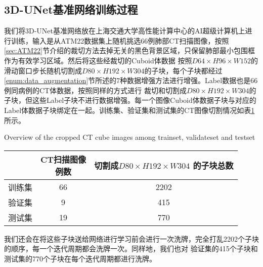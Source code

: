 \subsection{3D-UNet基准网络训练过程}\label{sec:baseline_experiment_training}
我们将3D-UNet基准网络放在上海交通大学高性能计算中心的AI超级计算机上进行训练，输入是从ATM22数据集上随机挑选66例肺部CT扫描图像，按照
\ref{sec:ATM22}节介绍的裁切方法去掉无关的黑色背景区域，只保留肺部最小包围框作为有效学习区域。然后将这些经裁切的Cuboid体数据
按照$D64 \times H96 \times W152$的滑动窗口步长随机切割成$D80 \times H192 \times W304$的子块，每个子块都经过
\ref{enum:data_augmentation}节所述的7种数据增强方法进行增强。Label数据也是66例同病例的CT体数据，按照同样的方式进行
裁切和切割成$D80 \times H192 \times W304$的子块，但这些Label子块不进行数据增强。每一个图像Cuboid体数据子块与对应的
Label体数据子块绑定在一起。训练集、验证集和测试集的CT图像切割情况如表\ref{tbl:dataset_overview}所示。
\begin{table}[!htp]
        {Overview of the cropped CT cube images among trainset, validateset and testset}
    \label{tbl:dataset_overview}
    \centering
    \begin{tabular}{c|c|c}
        \hline
          & \makecell{CT扫描图像\\例数} & \makecell{切割成$D80 \times H192 \times W304$\\的子块总数} \\
        \hline
        训练集 & 66 & 2202 \\
        验证集 & 9  & 415 \\
        测试集 & 19 & 770 \\
        \hline
    \end{tabular}
\end{table}
我们还会在将这些子块送给网络进行学习前会进行一次洗牌，完全打乱2202个子块的顺序，每一个迭代周期都会洗牌一次。同样地，我们也对
验证集的415个子块和测试集的770个子块在每个迭代周期都进行洗牌。

